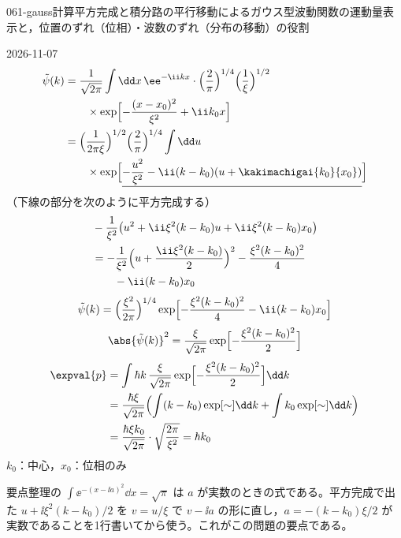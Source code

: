 \documentclass[uplatex,dvipdfmx,a4paper,11pt]{jsarticle}
\begin{document}
\begin{mondai}{061-gauss}{計算}{平方完成と積分路の平行移動によるガウス型波動関数の運動量表示と，位置のずれ（位相）・波数のずれ（分布の移動）の役割}
\begin{kotaeutsushi}{2026-11-07}
\begin{align*}
\tilde{\psi}(k)&=\frac{1}{\sqrt{2\pi}}\int\dd x\,\ee^{-\ii kx}\cdot\Bigl(\frac{2}{\pi}\Bigr)^{1/4}\Bigl(\frac{1}{\xi}\Bigr)^{1/2}\\
&\qquad\times\exp\Bigl[-\frac{(x-x_{0})^{2}}{\xi^{2}}+\ii k_{0}x\Bigr]\\
&=\Bigl(\frac{1}{2\pi\xi}\Bigr)^{1/2}\Bigl(\frac{2}{\pi}\Bigr)^{1/4}\int\dd u\\
&\qquad\times\exp\Bigl[\underline{-\frac{u^{2}}{\xi^{2}}-\ii(k-k_{0})(u+\kakimachigai{k_{0}}{x_{0}})}\Bigr]
\end{align*}
（下線の部分を次のように平方完成する）
\begin{align*}
&-\frac{1}{\xi^{2}}\bigl(u^{2}+\ii\xi^{2}(k-k_{0})u+\ii\xi^{2}(k-k_{0})x_{0}\bigr)\\
&=-\frac{1}{\xi^{2}}\Bigl(u+\frac{\ii\xi^{2}(k-k_{0})}{2}\Bigr)^{2}-\frac{\xi^{2}(k-k_{0})^{2}}{4}\\
&\qquad-\ii(k-k_{0})x_{0}
\end{align*}
\[ \tilde{\psi}(k)=\Bigl(\frac{\xi^{2}}{2\pi}\Bigr)^{1/4}\exp\Bigl[-\frac{\xi^{2}(k-k_{0})^{2}}{4}-\ii(k-k_{0})x_{0}\Bigr] \]
\[ \abs{\tilde{\psi}(k)}^{2}=\frac{\xi}{\sqrt{2\pi}}\exp\Bigl[-\frac{\xi^{2}(k-k_{0})^{2}}{2}\Bigr] \]
\begin{align*}
\expval{p}&=\int\hbar k\,\frac{\xi}{\sqrt{2\pi}}\exp\Bigl[-\frac{\xi^{2}(k-k_{0})^{2}}{2}\Bigr]\dd k\\
&=\frac{\hbar\xi}{\sqrt{2\pi}}\Bigl(\int(k-k_{0})\exp[\sim]\dd k+\int k_{0}\exp[\sim]\dd k\Bigr)\\
&=\frac{\hbar\xi k_{0}}{\sqrt{2\pi}}\cdot\sqrt{\frac{2\pi}{\xi^{2}}}=\hbar k_{0}
\end{align*}
$k_{0}$：中心，$x_{0}$：位相のみ
\end{kotaeutsushi}
\begin{kizuki}
\item 要点整理の $\int\ee^{-(x-\ii a)^{2}}\dd x=\sqrt{\pi}$ は $a$ が実数のときの式である。平方完成で出た $u+\ii\xi^{2}(k-k_{0})/2$ を $v=u/\xi$ で $v-\ii a$ の形に直し，$a=-(k-k_{0})\xi/2$ が実数であることを1行書いてから使う。これがこの問題の要点である。

\end{kizuki}
\end{mondai}
\end{document}
